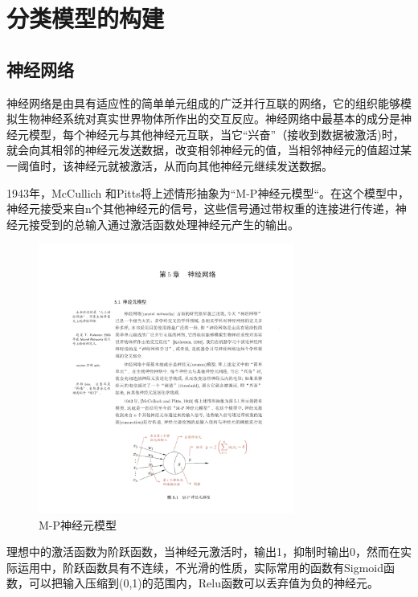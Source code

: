 \section{分类模型的构建}
\subsection{神经网络}
神经网络是由具有适应性的简单单元组成的广泛并行互联的网络，它的组织能够模拟生物神经系统对真实世界物体所作出的交互反应\cite{kohonen1988introduction}。神经网络中最基本的成分是神经元模型，每个神经元与其他神经元互联，当它“兴奋”（接收到数据被激活)时，就会向其相邻的神经元发送数据，改变相邻神经元的值，当相邻神经元的值超过某一阈值时，该神经元就被激活，从而向其他神经元继续发送数据。
\par 1943年，McCullich 和Pitts\cite{mcculloch1943logical}将上述情形抽象为“M-P神经元模型“。在这个模型中，神经元接受来自n个其他神经元的信号，这些信号通过带权重的连接进行传递，神经元接受到的总输入通过激活函数处理神经元产生的输出。
\begin{figure}[htbp]
\begin{center}
\includegraphics[width=0.75\textwidth]{figures//2.pdf}
\caption{M-P神经元模型}
\label{default}
\end{center}
\end{figure}
\par 理想中的激活函数为阶跃函数，当神经元激活时，输出1，抑制时输出0，然而在实际运用中，阶跃函数具有不连续，不光滑的性质，实际常用的函数有Sigmoid函数，可以把输入压缩到(0,1)的范围内，Relu函数可以丢弃值为负的神经元。

